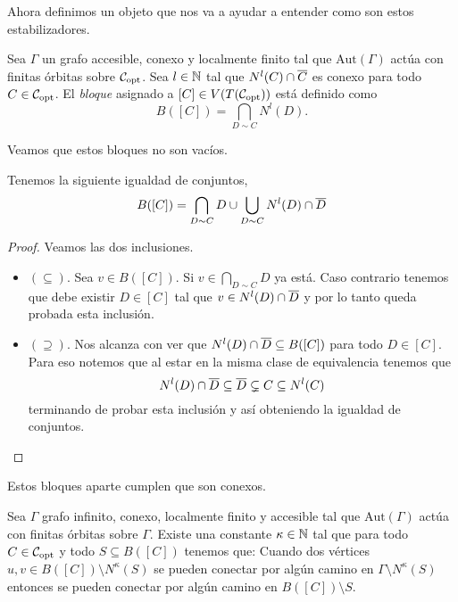 \documentclass[tesis.tex]{subfiles}
\newcommand{\aut}{\text{Aut}}
\begin{document}
Ahora definimos un objeto que nos va a ayudar a entender como son estos estabilizadores.

\begin{deff}
	Sea $\Gamma$ un grafo accesible, conexo y localmente finito
	tal que $\aut(\Gamma)$ actúa con finitas órbitas sobre ${\cal C}_{\text{opt}}$.
	Sea $l \in \mathbb{N}$ tal que $N^l(C) \cap \overline C$ es conexo para todo $C \in {\cal C}_{\text{opt}}$.
	El \emph{bloque} asignado a $[C] \in V(T({\cal C}_{\text{opt}}))$ está definido como
	\[
		B([C]) = \bigcap_{D \sim C} N^l (D).
	\]	
\end{deff}



Veamos que estos bloques no son vacíos.

\begin{lema}\label{lema_bloques_def_equiv}
	Tenemos la siguiente igualdad de conjuntos,
	\[
		B([C]) = \bigcap_{D \sim C} D \cup \bigcup_{D \sim C} N^l(D) \cap \overline D
	\]
\end{lema}

\begin{proof}
	Veamos las dos inclusiones.
	
	\begin{itemize}
		\item \textbf{$(\subseteq)$}. 
		Sea $v \in B([C])$. 
		Si $v \in \bigcap_{D \sim C} D$ ya está. 
		Caso contrario tenemos que debe existir $D \in [C]$ tal que $v \in N^l(D) \cap \overline D$ y por lo tanto queda probada esta inclusión.
		\item \textbf{$(\supseteq)$}. 
		Nos alcanza con ver que $ N^l(D) \cap \overline D \subseteq B([C])$ para todo $D \in [C]$.
		Para eso notemos que al estar en la misma clase de equivalencia tenemos que 
		\[
			N^l(D) \cap \overline D \subseteq \overline D \subsetneq C \subseteq N^l(C)
		\]
		terminando de probar esta inclusión y así obteniendo la igualdad de conjuntos.
	\end{itemize}
\end{proof}




Estos bloques aparte cumplen que son conexos.

\begin{lema}\label{lema_conexion_B(C)}
	Sea $\Gamma$ grafo infinito, conexo, localmente finito y accesible tal que $\aut(\Gamma)$ actúa con finitas órbitas sobre $\Gamma$.
	Existe una constante $\kappa \in \mathbb{N}$ tal que para todo $C \in {\cal C}_{\text{opt}}$ y todo $S \subseteq B([C])$ tenemos que: 
	Cuando dos vértices $u,v \in B([C]) \setminus N^\kappa(S)$ se pueden conectar por algún camino en $\Gamma \setminus N^{\kappa}(S)$ entonces se pueden conectar por algún camino en $B([C]) \setminus S$. 
\end{lema}
\end{document}
